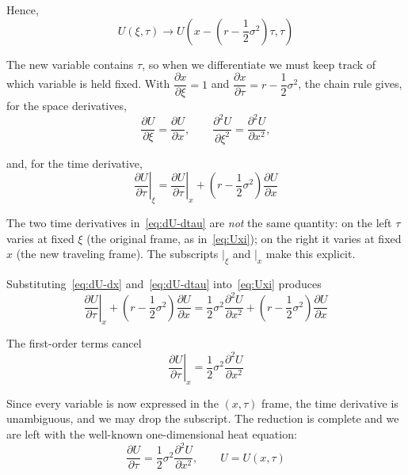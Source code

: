 \documentclass[a4paper,12pt]{article}
\numberwithin{equation}{section}
\begin{document}
Hence, 
\begin{equation}\label{eq:u-xtau}
  U(\xi, \tau) \rightarrow U\left(x - \left(r - \frac{1}{2}\sigma^2\right)\tau, \tau\right)
\end{equation}

The new variable contains $\tau$, so when we differentiate we must keep track of
which variable is held fixed. With $\dfrac{\partial x}{\partial \xi} = 1$ and
$\dfrac{\partial x}{\partial \tau} = r - \dfrac{1}{2}\sigma^2$, the chain rule
gives, for the space derivatives,
\begin{equation}\label{eq:dU-dx}
  \frac{\partial U}{\partial \xi} = \frac{\partial U}{\partial x},
  \qquad
  \frac{\partial^2 U}{\partial \xi^2} = \frac{\partial^2 U}{\partial x^2},
\end{equation}

and, for the time derivative,
\begin{equation}\label{eq:dU-dtau}
  \left.\frac{\partial U}{\partial \tau}\right|_{\xi}
    = \left.\frac{\partial U}{\partial \tau}\right|_{x}
    + \left(r - \frac{1}{2}\sigma^2\right)\frac{\partial U}{\partial x}
\end{equation}

The two time derivatives in~\eqref{eq:dU-dtau} are \emph{not} the same quantity:
on the left $\tau$ varies at fixed $\xi$ (the original frame, as
in~\eqref{eq:Uxi}); on the right it varies at fixed $x$ (the new traveling
frame). The subscripts $|_{\xi}$ and $|_{x}$ make this explicit.

Substituting~\eqref{eq:dU-dx} and~\eqref{eq:dU-dtau} into~\eqref{eq:Uxi} produces
\begin{equation}
  \left.\frac{\partial U}{\partial \tau}\right|_{x}
    + \left(r - \frac{1}{2}\sigma^2\right)\frac{\partial U}{\partial x}
  = \frac{1}{2}\sigma^2\frac{\partial^2 U}{\partial x^2}
    + \left(r - \frac{1}{2}\sigma^2\right)\frac{\partial U}{\partial x}
\end{equation}

The first-order terms cancel 
\begin{equation}\label{eq:heat-1}
  \left.\frac{\partial U}{\partial \tau}\right|_{x}
    = \frac{1}{2}\sigma^2\frac{\partial^2 U}{\partial x^2}
\end{equation}

Since every variable is now expressed in the $(x,\tau)$ frame, the time
derivative is unambiguous, and we may drop the subscript. The reduction is
complete and we are left with the well-known  one-dimensional heat equation:
\begin{equation}\label{eq:heat-2}
  \frac{\partial U}{\partial \tau}
    = \frac{1}{2}\sigma^2\frac{\partial^2 U}{\partial x^2},
  \qquad U = U(x,\tau)
\end{equation}
\end{document}
